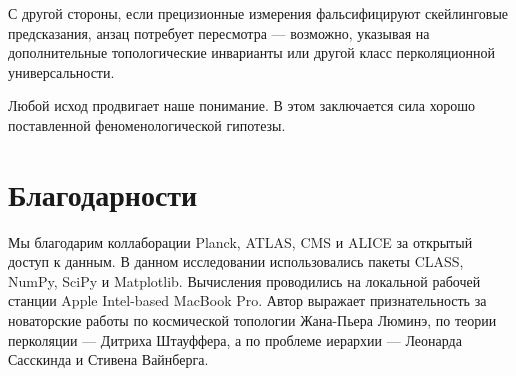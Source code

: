 \documentclass[11pt,a4paper]{article}
\begin{document}
С другой стороны, если прецизионные измерения фальсифицируют скейлинговые предсказания, анзац потребует пересмотра --- возможно, указывая на дополнительные топологические инварианты или другой класс перколяционной универсальности. 

Любой исход продвигает наше понимание. В этом заключается сила хорошо поставленной феноменологической гипотезы.

\section*{Благодарности}
Мы благодарим коллаборации Planck, ATLAS, CMS и ALICE за открытый доступ к данным. В данном исследовании использовались пакеты CLASS, NumPy, SciPy и Matplotlib. Вычисления проводились на локальной рабочей станции Apple Intel-based MacBook Pro. Автор выражает признательность за новаторские работы по космической топологии Жана-Пьера Люминэ, по теории перколяции --- Дитриха Штауффера, а по проблеме иерархии --- Леонарда Сасскинда и Стивена Вайнберга.
\end{document}
